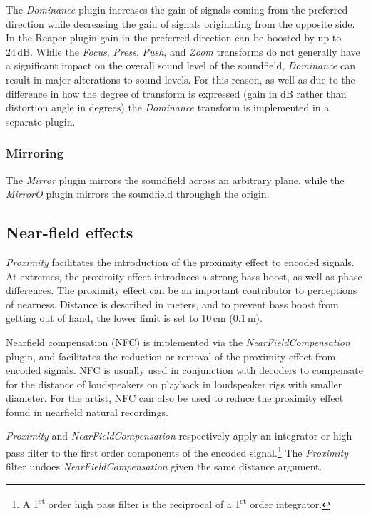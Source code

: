 \documentclass{article}
\begin{document}
The \emph{Dominance} plugin increases the gain of signals coming from the preferred direction while decreasing the gain of signals originating from the opposite side.
In the Reaper plugin gain in the preferred direction can be boosted by up to $24\,\mathrm{dB}$.
While the \emph{Focus}, \emph{Press}, \emph{Push}, and \emph{Zoom} transforms do not generally have a significant impact on the overall sound level of the soundfield, \emph{Dominance} can result in major alterations to sound levels.
For this reason, as well as due to the difference in how the degree of transform is expressed (gain in $\mathrm{dB}$ rather than distortion angle in $\mathrm{degrees}$) the \emph{Dominance} transform is implemented in a separate plugin.


\subsubsection{Mirroring}\label{sec:mirror}

The \emph{Mirror} plugin mirrors the soundfield across an arbitrary plane, while the \emph{MirrorO} plugin mirrors the soundfield throughgh the origin.



\subsection{Near-field effects}\label{sec:near-field}

\emph{Proximity} facilitates the introduction of the proximity effect to encoded signals.
At extremes, the proximity effect introduces a strong bass boost, as well as phase differences.
The proximity effect can be an important contributor to perceptions of nearness.
Distance is described in meters, and to prevent bass boost from getting out of hand, the lower limit is set to $10\,\mathrm{cm}$ ($0.1\,\mathrm{m}$).

Near\-field compensation (NFC) is implemented via the \emph{NearFieldCompensation} plugin, and facilitates the reduction or removal of the proximity effect from encoded signals.
NFC is usually used in conjunction with decoders to compensate for the distance of loudspeakers on playback in loudspeaker rigs with smaller diameter. For the artist, NFC can also be used to reduce the proximity effect found in nearfield natural recordings.

\emph{Proximity} and \emph{NearFieldCompensation} respectively apply an integrator or high pass filter to the first order components of the encoded signal.\footnote{A 1\textsuperscript{st} order high pass filter is the reciprocal of a 1\textsuperscript{st} order integrator.} The \emph{Proximity} filter undoes \emph{NearFieldCompensation} given the same distance argument.
\end{document}
